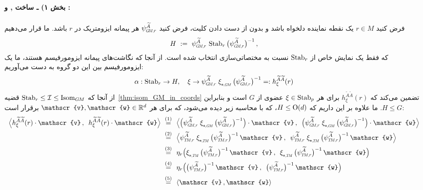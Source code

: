 \paragraph{بخش ۱) ـ ساخت \textit{}, \textit{} و \textsubscript{\textit{}}:}
فرض کنید $r\in M$ یک نقطه نماینده دلخواه باشد و بدون از دست دادن کلیت، فرض کنید $\psiGMr^{\widetilde{A}}$ هر پیمانه ایزومتریک در $r$ باشد.
ما قرار می‌دهیم
\begin{align}
	H\ :=\ \psiGMr^{\widetilde{A}} \,\Stab{r} \big(\psiGMr^{\widetilde{A}} \big)^{-1} \,,
\end{align}
که فقط یک نمایش خاص از $\operatorname{Stab}_{r}$ نسبت به مختصاتی‌سازی انتخاب شده است.
از آنجا که نگاشت‌های پیمانه ایزومورفیسم هستند، ما یک ایزومورفیسم بین این دو گروه به دست می‌آوریم:
\begin{align}\label{eq:stabr_H_iso}
	\alpha: \Stab{r} \to H,\ \ \ \xi \to \psiGMr^{\widetilde{A}} \;\dxiGM\, \big(\psiGMr^{\widetilde{A}} \big)^{-1} =: h_\xi^{\widetilde{A}\widetilde{A}}(r)
\end{align}
از آنجا که $\operatorname{Stab}_{r} \leq \mathcal{I} \leq \operatorname{Isom}_{G\mkern-1.4muM}$ قضیه~\ref{thm:isom_GM_in_coords} تضمین می‌کند که $h_\xi^{\widetilde{A}\widetilde{A}}(r)$ برای هر $\xi \in \operatorname{Stab}_{p}$ عضوی از $G$ است و بنابراین $H \leq G$.
ما علاوه بر این داریم که $H\leq\operatorname{O}(d)$، که با محاسبه زیر دیده می‌شود، که برای هر $\mathscr{v},\mathscr{w} \in \R^d$ برقرار است:
\begin{align}
	\pig\langle h_\xi^{\widetilde{A}\widetilde{A}}(r) \cdot\mathscr{v} \,,\,\ h_\xi^{\widetilde{A}\widetilde{A}}(r) \cdot\mathscr{w} \pig\rangle
	\ \overset{(1)}{=}&\ \ \pig\langle \pig( \psiGMr^{\widetilde{A}} \;\dxiGM\, \big(\psiGMr^{\widetilde{A}} \big)^{-1} \pig) \cdot \mathscr{v} \,,\,\ \pig( \psiGMr^{\widetilde{A}} \;\dxiGM\, \big(\psiGMr^{\widetilde{A}} \big)^{-1} \pig) \cdot \mathscr{w} \pig\rangle \notag \\
	\ \overset{(2)}{=}&\ \ \pig\langle \psiTMr^{\widetilde{A}} \;\dxiTM\, \big(\psiTMr^{\widetilde{A}} \big)^{-1} \,\mathscr{v} \,,\,\ \psiTMr^{\widetilde{A}} \;\dxiTM\, \big(\psiTMr^{\widetilde{A}} \big)^{-1} \,\mathscr{w} \pig\rangle \notag \\
	\ \overset{(3)}{=}&\ \ \eta_r\pig( \dxiTM\, \big(\psiTMr^{\widetilde{A}} \big)^{-1} \,\mathscr{v} \,,\,\ \dxiTM\, \big(\psiTMr^{\widetilde{A}} \big)^{-1} \,\mathscr{w} \pig) \notag \\
	\ \overset{(4)}{=}&\ \ \eta_r\pig( \big(\psiTMr^{\widetilde{A}} \big)^{-1} \,\mathscr{v} \,,\,\ \big(\psiTMr^{\widetilde{A}} \big)^{-1} \,\mathscr{w} \pig) \notag \\
	\ \overset{(5)}{=}&\ \ \langle \mathscr{v} \,, \mathscr{w} \rangle
\end{align}
